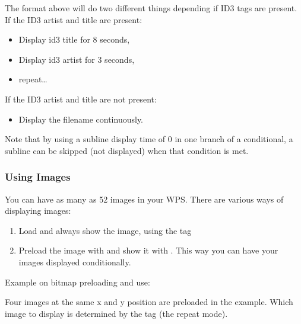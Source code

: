 The format above will do two different things depending if ID3 tags are 
present. If the ID3 artist and title are present:
\begin{itemize}
\item Display id3 title for 8 seconds,
\item Display id3 artist for 3 seconds,
\item repeat\dots
\end{itemize}
If the ID3 artist and title are not present:
\begin{itemize}
\item Display the filename continuously.
\end{itemize}
Note that by using a subline display time of 0 in one branch of a conditional,
a subline can be skipped (not displayed) when that condition is met. 

\subsubsection{Using Images}
You can have as many as 52 images in your WPS. There are various ways of 
displaying images:
\begin{enumerate}
  \item Load and always show the image, using the  tag
  \item Preload the image with  and show it with . 
    This way you can have your images displayed conditionally.
\end{enumerate}

%

Example on bitmap preloading and use:
\begin{example}
\end{example}
Four images at the same x and y position are preloaded in the example. Which 
image to display is determined by the  tag (the repeat mode).

